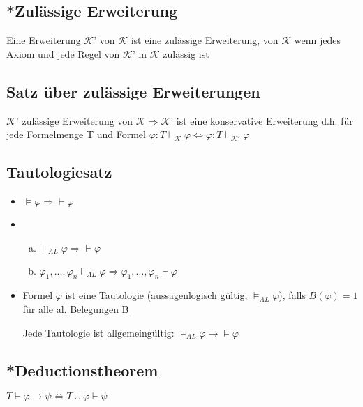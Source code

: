 \documentclass[12pt,a4paper]{article} %
\begin{document}
	\subsection{*Zulässige Erweiterung}
	Eine Erweiterung $\mathcal{K}$' von $\mathcal{K}$ ist eine zulässige Erweiterung, von $\mathcal{K}$ wenn jedes Axiom und jede \hyperref[Kalkul]{Regel} von $\mathcal{K}$' in $\mathcal{K}$ \hyperref[Zulassig]{zulässig} ist
	
	\subsection{Satz über zulässige Erweiterungen}
	$\mathcal{K}$' zulässige Erweiterung von $\mathcal{K} \Rightarrow \mathcal{K}$' ist eine konservative Erweiterung d.h. für jede Formelmenge T und \hyperref[Formel]{Formel} $\varphi: T \hyperref[Beweisbar]{\vdash_{\mathcal{K}}} \varphi \Leftrightarrow \varphi: T \hyperref[Beweisbar]{\vdash_{\mathcal{K}'}} \varphi$
	
	\subsection{Tautologiesatz}
	\begin{itemize}
		\item $\hyperref[Erfullbar]{\vDash} \varphi \Rightarrow \hyperref[Beweisbar]{\vdash} \varphi$
		\item \begin{enumerate}[(a)]
			\item $\vDash_{AL} \varphi \Rightarrow \hyperref[Beweisbar]{\vdash} \varphi$ 
			\item $\varphi_1, ..., \varphi_n \vDash_{AL} \varphi \Rightarrow \varphi_1, ..., \varphi_n \hyperref[Beweisbar]{\vdash} \varphi$
		\end{enumerate}
		\item \hyperref[Formel]{Formel} $\varphi$ ist eine Tautologie (aussagenlogisch gültig, $\hyperref[Erfullbar]{\vDash_{AL}} \varphi$), falls $B(\varphi) = 1$ für alle al. \hyperref[Belegung]{Belegungen B}
		
		Jede Tautologie ist allgemeingültig: $\hyperref[Erfullbar]{\vDash_{AL}} \varphi \rightarrow \hyperref[Erfullbar]{\vDash} \varphi$
	\end{itemize}
	
	\subsection{*Deductionstheorem}
	$T \hyperref[Beweisbar]{\vdash} \varphi \rightarrow \psi \Leftrightarrow T \cup \varphi \hyperref[Beweisbar]{\vdash} \psi$
	
\end{document}
